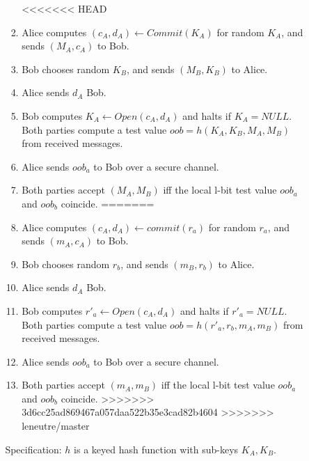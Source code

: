\begin{enumerate}
\begin{enumerate}
\begin{enumerate}
\begin{enumerate}
<<<<<<< HEAD
\item Alice computes $(c_A,d_A) \leftarrow Commit(K_A)$ for random $K_A$, and sends $(M_A,c_A)$ to Bob.
\item Bob chooses random $K_B$, and sends $(M_B,K_B)$ to Alice.
\item Alice sends $d_A$ Bob.
\item Bob computes $K_A \leftarrow Open(c_A,d_A)$ and halts if $K_A = NULL$. Both parties compute a test value $oob = h(K_A,K_B,M_A,M_B)$ from received messages.
\item Alice sends $oob_a$ to Bob over a secure channel. 
\item Both parties accept $(M_A,M_B)$ iff the local l-bit test value $oob_a$ and $oob_b$ coincide. 
=======
\item Alice computes $(c_A,d_A) \leftarrow commit(r_a)$ for random $r_a$, and sends $(m_A,c_A)$ to Bob.
\item Bob chooses random $r_b$, and sends $(m_B,r_b)$ to Alice.
\item Alice sends $d_A$ Bob.
\item Bob computes $r'_a \leftarrow Open(c_A,d_A)$ and halts if $r'_a= NULL$. Both parties compute a test value $oob = h(r'_a,r_b,m_A,m_B)$ from received messages.
\item Alice sends $oob_a$ to Bob over a secure channel. 
\item Both parties accept $(m_A,m_B)$ iff the local l-bit test value $oob_a$ and $oob_b$ coincide. 
>>>>>>> 3d6cc25ad869467a057daa522b35e3cad82b4604
>>>>>>> leneutre/master
\end{enumerate}

Specification: $h$ is a keyed hash function with sub-keys $K_A, K_B$.


\end{enumerate}
\end{enumerate}
\end{enumerate}
